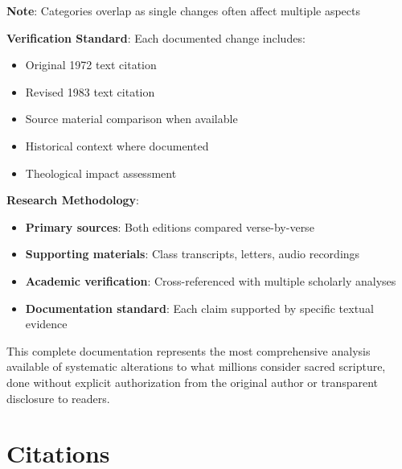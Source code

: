 \documentclass[11pt,twoside]{book}
\begin{document}
\textbf{\textbf{Note}}: Categories overlap as single changes often affect multiple aspects

\textbf{\textbf{Verification Standard}}: Each documented change includes:
\begin{itemize}
\item Original 1972 text citation
\item Revised 1983 text citation
\item Source material comparison when available
\item Historical context where documented
\item Theological impact assessment
\end{itemize}

\textbf{\textbf{Research Methodology}}: 
\begin{itemize}
\item \textbf{\textbf{Primary sources}}: Both editions compared verse-by-verse
\item \textbf{\textbf{Supporting materials}}: Class transcripts, letters, audio recordings
\item \textbf{\textbf{Academic verification}}: Cross-referenced with multiple scholarly analyses
\item \textbf{\textbf{Documentation standard}}: Each claim supported by specific textual evidence
\end{itemize}

This complete documentation represents the most comprehensive analysis available of systematic alterations to what millions consider sacred scripture, done without explicit authorization from the original author or transparent disclosure to readers.
\part*{Citations}
\label{sec:org7b91a38}
\thispagestyle{chapterpage}
\end{document}
